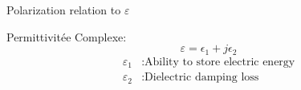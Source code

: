 \begin{frame}{Polarization relation to $\varepsilon$}
        \begin{twocolumns}[0.4]
        \leftcol
            Permittivitée Complexe:
            \begin{equation*}
                \varepsilon = \epsilon_1 + j \epsilon_2
            \end{equation*}
            \vspace{5pt}
            \begin{equation*}
                \begin{aligned}
                    \varepsilon_1 &: \text{Ability to store electric energy}\\
                    \varepsilon_2 &: \text{Dielectric damping loss}\\
                \end{aligned}
            \end{equation*}
        \rightcol
        \end{twocolumns}
\end{frame}



